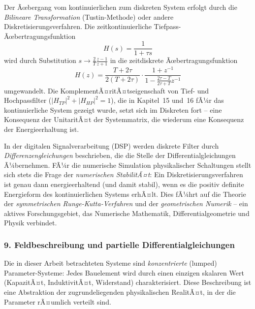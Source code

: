 ﻿\documentclass[12pt, a4paper]{article}
\begin{document}
	Der Ãœbergang vom kontinuierlichen zum diskreten System erfolgt durch die \textit{Bilineare Transformation} (Tustin-Methode) oder andere Diskretisierungsverfahren. Die zeitkontinuierliche Tiefpass-Ãœbertragungsfunktion
	\begin{equation}
		H(s) = \frac{1}{1 + \tau s}
	\end{equation}
	wird durch Substitution $s \to \frac{2}{T}\frac{z - 1}{z + 1}$ in die zeitdiskrete Ãœbertragungsfunktion
	\begin{equation}
		H(z) = \frac{T + 2\tau}{2(T + 2\tau)} \cdot \frac{1 + z^{-1}}{1 - \frac{2\tau - T}{2\tau + T} z^{-1}}
	\end{equation}
	umgewandelt. Die KomplementÃ¤ritÃ¤tseigenschaft von Tief- und Hochpassfilter ($|H_{TP}|^2 + |H_{HP}|^2 = 1$), die in Kapitel~15 und~16 fÃ¼r das kontinuierliche System gezeigt wurde, setzt sich im Diskreten fort -- eine Konsequenz der UnitaritÃ¤t der Systemmatrix, die wiederum eine Konsequenz der Energieerhaltung ist.

	In der digitalen Signalverarbeitung (DSP) werden diskrete Filter durch \textit{Differenzengleichungen} beschrieben, die die Stelle der Differentialgleichungen Ã¼bernehmen. FÃ¼r die numerische Simulation physikalischer Schaltungen stellt sich stets die Frage der \textit{numerischen StabilitÃ¤t}: Ein Diskre\-tisierungsverfahren ist genau dann energieerhaltend (und damit stabil), wenn es die positiv definite Energieform des kontinuierlichen Systems erhÃ¤lt. Dies fÃ¼hrt auf die Theorie der \textit{symmetrischen Runge-Kutta-Verfahren} und der \textit{geometrischen Numerik} -- ein aktives Forschungsgebiet, das Numerische Mathematik, Differential\-geometrie und Physik verbindet.

	\subsubsection*{9. \quad Feldbeschreibung und partielle Differentialgleichungen}

	Die in dieser Arbeit betrachteten Systeme sind \textit{konzentrierte} (lumped) Parameter-Systeme: Jedes Bauelement wird durch einen einzigen skalaren Wert (KapazitÃ¤t, InduktivitÃ¤t, Widerstand) charakterisiert. Diese Beschreibung ist eine Abstraktion der zugrundeliegenden physikalischen RealitÃ¤t, in der die Parameter rÃ¤umlich verteilt sind.
\end{document}
